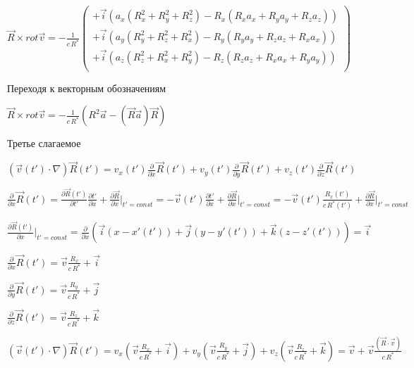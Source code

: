 \documentclass[11pt]{article}
\begin{document}
    \(\vec R \times rot \overrightarrow{v}=-\frac{1}{c\,{{R}^{*}}}\left(\begin{array}{c}  +\vec i \left(a_x\left(R_x^2 + R_y^2 + R_z^2\right) - R_x \left(R_x a_x + R_y a_y + R_z a_z \right) \right) \\  +\vec i \left(a_y\left(R_y^2 + R_z^2 + R_x^2\right) - R_y \left(R_y a_y + R_z a_z + R_x a_x \right) \right) \\  +\vec i \left(a_z\left(R_z^2 + R_x^2 + R_y^2\right) - R_z \left(R_z a_z + R_x a_x + R_y a_y \right) \right) \\ \end{array}\right)\)

    Переходя к векторным обозначениям

\(\vec R \times rot \overrightarrow{v}=-\frac{1}{c\,{{R}^{*}}}\left(R^2 \vec a - \left(\vec R \vec a\right) \vec R\right)\)

    Третье слагаемое

\(\left(\overrightarrow{v}\left(t'\right) \cdot \nabla\right) \overrightarrow{R}\left(t'\right)  = v_x\left(t'\right) \frac{\partial}{\partial x} \overrightarrow{R}\left(t'\right)  + v_y\left(t'\right) \frac{\partial}{\partial y} \overrightarrow{R}\left(t'\right)  + v_z\left(t'\right) \frac{\partial}{\partial z} \overrightarrow{R}\left(t'\right)\)

    \(\frac{\partial}{\partial x} \vec R\left(t'\right)  = \frac{\partial \vec R\left(t'\right)}{\partial t'} \frac{\partial t'}{\partial x} + \frac{\partial \vec R}{\partial x}\Big|_{t'=const}  = - \vec v\left(t'\right) \frac{\partial t'}{\partial x} + \frac{\partial \vec R}{\partial x}\Big|_{t'=const}  = - \vec v\left(t'\right) \frac{R_x\left(t'\right)}{c\,{{R}^{*}}\left(t'\right)} + \frac{\partial \vec R}{\partial x}\Big|_{t'=const}\)

    \(\frac{\partial\vec R\left(t'\right)}{\partial x} \Big|_{t'=const}  = \frac{\partial}{\partial x}\left(\vec i \left(x-x'\left(t'\right)\right)  + \vec j \left(y-y'\left(t'\right)\right)  + \vec k \left(z-z'\left(t'\right)\right)\right)  = \vec i\)

    \(\frac{\partial}{\partial x} \vec R\left(t'\right) = \vec v \frac{R_x}{c\,{{R}^{*}}} + \vec i\)

    \(\frac{\partial}{\partial y} \vec R\left(t'\right) = \vec v \frac{R_y}{c\,{{R}^{*}}} + \vec j\)

    \(\frac{\partial}{\partial z} \vec R\left(t'\right) = \vec v \frac{R_z}{c\,{{R}^{*}}} + \vec k\)

    \(\left(\overrightarrow{v}\left(t'\right) \cdot \nabla\right) \overrightarrow{R}\left(t'\right)  = v_x\left(\vec v \frac{R_x}{c\,{{R}^{*}}} + \vec i\right)  + v_y\left(\vec v \frac{R_y}{c\,{{R}^{*}}} + \vec j\right)  + v_z\left(\vec v \frac{R_z}{c\,{{R}^{*}}} + \vec k\right)  = \vec v + \vec v \frac{\left(\vec R \cdot \vec v\right)}{c\,{{R}^{*}}}\)
\end{document}
